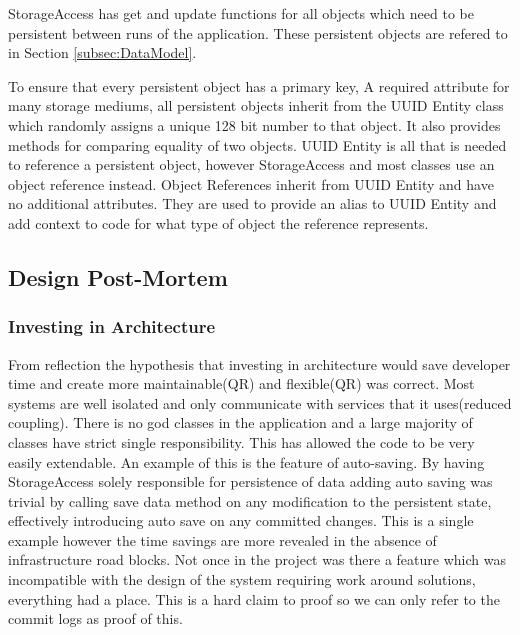 StorageAccess has get and update functions for all objects which need to be persistent between runs of the application. These persistent objects are refered to in Section \ref{subsec:DataModel}. 

To ensure that every persistent object has a primary key, A required attribute for many storage mediums, all persistent objects inherit from the UUID Entity class which randomly assigns a unique 128 bit number to that object. It also provides methods for comparing equality of two objects. UUID Entity is all that is needed to reference a persistent object, however StorageAccess and most classes use an object reference instead. Object References inherit from UUID Entity and have no additional attributes. They are used to provide an alias to UUID Entity and add context to code for what type of object the reference represents.

\pagebreak

\subsection{Design Post-Mortem} \label{subsec:TechnicalDesignPost}
\subsubsection{Investing in Architecture}
From reflection the hypothesis that investing in architecture would save developer time and create more maintainable(QR) and flexible(QR) was correct. Most systems are well isolated and only communicate with services that it uses(reduced coupling). There is no god classes in the application and a large majority of classes have strict single responsibility. This has allowed the code to be very easily extendable. An example of this is the feature of auto-saving. By having StorageAccess solely responsible for persistence of data adding auto saving was trivial by calling save data method on any modification to the persistent state, effectively introducing auto save on any committed changes. This is a single example however the time savings are more revealed in the absence of infrastructure road blocks. Not once in the project was there a feature which was incompatible with the design of the system requiring work around solutions, everything had a place. This is a hard claim to proof so we can only refer to the commit logs as proof of this.

